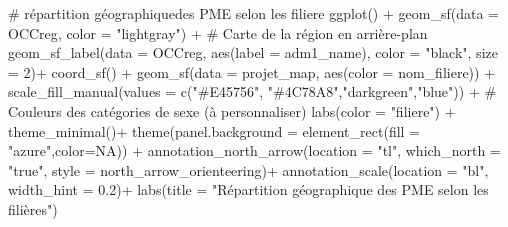 \documentclass[
  letterpaper,
  DIV=11,
  numbers=noendperiod]{scrartcl}
\newenvironment{Shaded}{\begin{snugshade}}{\end{snugshade}}
\newcommand{\AttributeTok}[1]{\textcolor[rgb]{0.40,0.45,0.13}{#1}}
\newcommand{\CommentTok}[1]{\textcolor[rgb]{0.37,0.37,0.37}{#1}}
\newcommand{\ConstantTok}[1]{\textcolor[rgb]{0.56,0.35,0.01}{#1}}
\newcommand{\DecValTok}[1]{\textcolor[rgb]{0.68,0.00,0.00}{#1}}
\newcommand{\FloatTok}[1]{\textcolor[rgb]{0.68,0.00,0.00}{#1}}
\newcommand{\FunctionTok}[1]{\textcolor[rgb]{0.28,0.35,0.67}{#1}}
\newcommand{\NormalTok}[1]{\textcolor[rgb]{0.00,0.23,0.31}{#1}}
\newcommand{\SpecialCharTok}[1]{\textcolor[rgb]{0.37,0.37,0.37}{#1}}
\newcommand{\StringTok}[1]{\textcolor[rgb]{0.13,0.47,0.30}{#1}}
\begin{document}
\begin{Shaded}
\begin{Highlighting}[]
\CommentTok{\# répartition géographiquedes PME selon les filiere}
\FunctionTok{ggplot}\NormalTok{() }\SpecialCharTok{+}
  \FunctionTok{geom\_sf}\NormalTok{(}\AttributeTok{data =}\NormalTok{ OCCreg, }\AttributeTok{color =} \StringTok{"lightgray"}\NormalTok{) }\SpecialCharTok{+}  \CommentTok{\# Carte de la région en arrière{-}plan}
  \FunctionTok{geom\_sf\_label}\NormalTok{(}\AttributeTok{data =}\NormalTok{ OCCreg, }\FunctionTok{aes}\NormalTok{(}\AttributeTok{label =}\NormalTok{ adm1\_name), }\AttributeTok{color =} \StringTok{"black"}\NormalTok{, }\AttributeTok{size =} \DecValTok{2}\NormalTok{)}\SpecialCharTok{+}
  \FunctionTok{coord\_sf}\NormalTok{() }\SpecialCharTok{+}
  \FunctionTok{geom\_sf}\NormalTok{(}\AttributeTok{data =}\NormalTok{ projet\_map, }\FunctionTok{aes}\NormalTok{(}\AttributeTok{color =}\NormalTok{ nom\_filiere)) }\SpecialCharTok{+}
  \FunctionTok{scale\_fill\_manual}\NormalTok{(}\AttributeTok{values =} \FunctionTok{c}\NormalTok{(}\StringTok{"\#E45756"}\NormalTok{, }\StringTok{"\#4C78A8"}\NormalTok{,}\StringTok{"darkgreen"}\NormalTok{,}\StringTok{"blue"}\NormalTok{)) }\SpecialCharTok{+}  \CommentTok{\# Couleurs des catégories de sexe (à personnaliser)}
  \FunctionTok{labs}\NormalTok{(}\AttributeTok{color =} \StringTok{"filiere"}\NormalTok{) }\SpecialCharTok{+}
  \FunctionTok{theme\_minimal}\NormalTok{()}\SpecialCharTok{+}
  \FunctionTok{theme}\NormalTok{(}\AttributeTok{panel.background =} \FunctionTok{element\_rect}\NormalTok{(}\AttributeTok{fill =} \StringTok{"azure"}\NormalTok{,}\AttributeTok{color=}\ConstantTok{NA}\NormalTok{)) }\SpecialCharTok{+}
  \FunctionTok{annotation\_north\_arrow}\NormalTok{(}\AttributeTok{location =} \StringTok{"tl"}\NormalTok{, }\AttributeTok{which\_north =} \StringTok{"true"}\NormalTok{, }\AttributeTok{style =}\NormalTok{ north\_arrow\_orienteering)}\SpecialCharTok{+}
  \FunctionTok{annotation\_scale}\NormalTok{(}\AttributeTok{location =} \StringTok{"bl"}\NormalTok{, }\AttributeTok{width\_hint =} \FloatTok{0.2}\NormalTok{)}\SpecialCharTok{+}
  \FunctionTok{labs}\NormalTok{(}\AttributeTok{title =} \StringTok{"Répartition géographique des PME selon les filières"}\NormalTok{)}
\end{Highlighting}
\end{Shaded}
\end{document}
